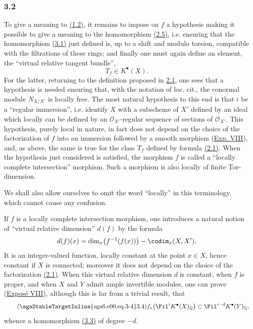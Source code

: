 \subsubsection*{3.2}
To give a meaning to \hyperlink{sga6.e00.eq.1-2}{(1.2)}, it remains to impose on $f$ a hypothesis making it possible to give a meaning to the homomorphism \hyperlink{sga6.e00.eq.2-5}{(2.5)}, i.e. ensuring that the homomorphism \hyperlink{sga6.e00.eq.3-1}{(3.1)} just defined is, up to a shift and modulo torsion, compatible with the filtrations of these rings; and finally one must again define an element, the ``virtual relative tangent bundle'',
\[
T_f\in K^\bullet(X).
\]
For the latter, returning to the definition proposed in \hyperlink{sga6.e00.sec.2.1}{2.1}, one sees that a hypothesis is needed ensuring that, with the notation of loc. cit., the conormal module $N_{X/X'}$ is locally free. The most natural hypothesis to this end is that $i$ be a ``regular immersion'', i.e. identify $X$ with a subscheme of $X'$ defined by an ideal which locally can be defined by an $\mathcal O_{X'}$-regular sequence of sections of $\mathcal O_{X'}$. This hypothesis, purely local in nature, in fact does not depend on the choice of the factorization of $f$ into an immersion followed by a smooth morphism (\hyperlink{sga6.e08.expose}{Exp. VIII}), and, as above, the same is true for the class $T_f$ defined by formula \hyperlink{sga6.e00.eq.2-1}{(2.1)}. When the hypothesis just considered is satisfied, the morphism $f$ is called a ``locally complete intersection'' morphism. Such a morphism is also locally of finite Tor-dimension.

We shall also allow ourselves to omit the word ``locally'' in this terminology, which cannot cause any confusion.

If $f$ is a locally complete intersection morphism, one introduces a natural notion of ``virtual relative dimension'' $d(f)$ by the formula
\[
d(f)(x)=\dim_x\bigl(f^{-1}(f(x))\bigr)-\codim_x(X,X').
\]
It is an integer-valued function, locally constant at the point $x\in X$, hence constant if $X$ is connected; moreover it does not depend on the choice of the factorization \hyperlink{sga6.e00.eq.2-1}{(2.1)}. When this virtual relative dimension $d$ is constant, when $f$ is proper, and when $X$ and $Y$ admit ample invertible modules, one can prove (\hyperlink{sga6.e08.expose}{Expos\'e VIII}), although this is far from a trivial result, that
\begin{equation}\tag{\sgaStableTargetInline{sga6.e00.eq.3-4}3.4}
f_*\bigl(\Fil^i K^\bullet(X)_{\mathbb Q}\bigr)\subset \Fil^{i-d}K^\bullet(Y)_{\mathbb Q},
\end{equation}
whence a homomorphism \hyperlink{sga6.e00.sec.3.3}{(3.3)} of degree $-d$.

